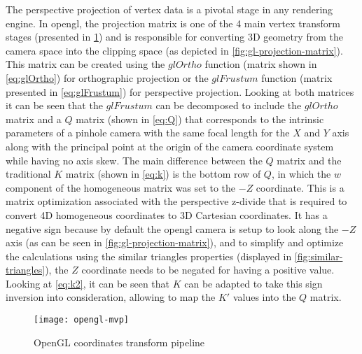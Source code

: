 The perspective projection of vertex data is a pivotal stage in any rendering engine. In \gls{opengl}, the projection matrix is one of the 4 main vertex transform stages (presented in \cref{fig:opengl-mvp}) and is responsible for converting 3D geometry from the camera space into the clipping space (as depicted in \cref{fig:gl-projection-matrix}). This matrix can be created using the $glOrtho$ function (matrix shown in \cref{eq:glOrtho}) for orthographic projection or the $glFrustum$ function (matrix presented in \cref{eq:glFrustum}) for perspective projection. Looking at both matrices it can be seen that the $glFrustum$ can be decomposed to include the $glOrtho$ matrix and a $Q$ matrix (shown in \cref{eq:Q}) that corresponds to the intrinsic parameters of a pinhole camera with the same focal length for the $X$ and $Y$ axis along with the principal point at the origin of the camera coordinate system while having no axis skew. The main difference between the $Q$ matrix and the traditional $K$ matrix \cite{Hartley2003} (shown in \cref{eq:k}) is the bottom row of $Q$, in which the $w$ component of the homogeneous matrix was set to the $-Z$ coordinate. This is a matrix optimization associated with the perspective z-divide that is required to convert 4D homogeneous coordinates to 3D Cartesian coordinates. It has a negative sign because by default the \gls{opengl} camera is setup to look along the $-Z$ axis (as can be seen in \cref{fig:gl-projection-matrix}), and to simplify and optimize the calculations using the similar triangles properties (displayed in \cref{fig:similar-triangles}), the $Z$ coordinate needs to be negated for having a positive value. Looking at \cref{eq:k2}, it can be seen that $K$ can be adapted to take this sign inversion into consideration, allowing to map the $K'$ values into the $Q$ matrix.

\vspace{-0.3em}
\begin{figure}[H]
	\centering
	\texttt{[image: opengl-mvp]}
	\caption[OpenGL rendering pipeline]{OpenGL coordinates transform pipeline\protect\footnotemark}
	\label{fig:opengl-mvp}
	\vspace{-0.7em}
\end{figure}
\vspace{-1em}

